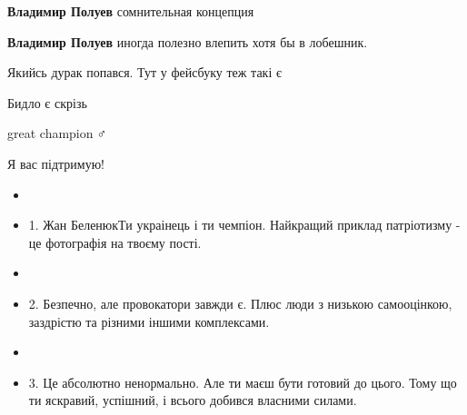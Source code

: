 \begin{itemize}
\begin{itemize}
\textbf{Владимир Полуев} сомнительная концепция


 
\textbf{Владимир Полуев} иногда полезно влепить хотя бы в лобешник.
\end{itemize}

 

Якийсь дурак попався.
Тут у фейсбуку теж такі є

 
Бидло є скрізь

 
great champion🤼♂️🥇

 
Я вас підтримую!


\begin{itemize}
  \item \item 1. Жан БеленюкТи украінець і ти чемпіон. Найкращий приклад патріотизму - це фотографія на твоєму пості.
  \item \item 2. Безпечно, але провокатори завжди є. Плюс люди з низькою самооцінкою, заздрістю та різними іншими комплексами.
  \item \item 3. Це абсолютно ненормально. Але ти маєш бути готовий до цього. Тому що ти яскравий, успішний, і всього добився власними силами.
\end{itemize}


\end{itemize}
